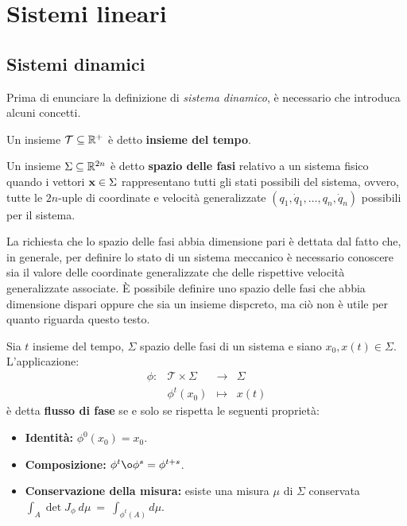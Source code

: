 \section{Sistemi lineari}

\subsection{Sistemi dinamici}
Prima di enunciare la definizione di \emph{sistema dinamico}, è necessario che
introduca alcuni concetti.

\begin{definition}
    Un insieme $\mathcal T \subseteq \mathbb{R}^+$ è detto \textbf{insieme del tempo}.
\end{definition}

\begin{definition}
    Un insieme $\Sigma \subseteq \mathbb{R}^{2n}$ è detto \textbf{spazio delle fasi}
    relativo a un sistema fisico quando i vettori
    $\mathbf{x} \in \Sigma$ rappresentano tutti gli stati possibili
    del sistema, ovvero,
    tutte le $2n$-uple di coordinate e velocità generalizzate $(q_1, \dot q_1, \ldots, q_n, \dot q_n)$
    possibili per il sistema.
\end{definition}
La richiesta che lo spazio delle fasi abbia dimensione pari è dettata dal
fatto che, in generale, per definire lo stato di un sistema meccanico è
necessario conoscere sia il valore delle coordinate generalizzate
che delle rispettive velocità generalizzate associate.
È possibile definire uno spazio delle fasi che abbia dimensione dispari
oppure che sia un insieme dispcreto, ma ciò non è utile per quanto riguarda
questo testo. 

\begin{definition}
    Sia $t$ insieme del tempo, $\Sigma$ spazio delle fasi di un sistema e siano $x_0, x(t) \in \Sigma$.
    L'applicazione: \\
    \begin{equation*}
        \begin{array}{cccc}%
            \phi: &\mathcal T \times \Sigma &\to &\Sigma \\
            &\phi^t(x_0) &\mapsto &x(t)
        \end{array}%
    \end{equation*}
    è detta \textbf{flusso di fase} se e solo se rispetta le seguenti proprietà:
    \begin{itemize}
        \item \textbf{Identità:} $\phi^0(x_0) = x_0$.
        \item \textbf{Composizione:} $\phi^t \o \phi^s = \phi^{t+s}$.
        \raggedright
        \item \textbf{Conservazione della misura:} esiste una misura $\mu$ di $\Sigma$ %
        conservata $\int_A \det J_\phi \ d\mu~=~\int_{\phi^t(A)} d\mu$.
    \end{itemize}
\end{definition}

